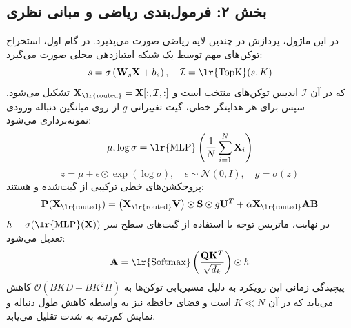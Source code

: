 \subsection*{بخش ۲: فرمول‌بندی ریاضی و مبانی نظری }
در این ماژول، پردازش در چندین لایه ریاضی صورت می‌پذیرد. در گام اول، استخراج توکن‌های مهم توسط یک شبکه امتیازدهی محلی صورت می‌گیرد:
\begin{equation}
s = \sigma\left(\mathbf{W}_s \mathbf{X} + b_s\right), \quad \mathcal{I} = \text{\lr{TopK}}(s, K)
\end{equation}
که در آن $\mathcal{I}$ اندیس توکن‌های منتخب است و $\mathbf{X}_{\text{\lr{routed}}} = \mathbf{X}[:, \mathcal{I}, :]$ تشکیل می‌شود. 
سپس برای هر هدایتگر خطی، گیت تغییراتی $g$ از روی میانگین دنباله ورودی نمونه‌برداری می‌شود:
\begin{equation}
\mu, \log \sigma = \text{\lr{MLP}}\left(\frac{1}{N} \sum_{i=1}^N \mathbf{X}_i\right)
\end{equation}
\begin{equation}
z = \mu + \epsilon \odot \exp(\log \sigma), \quad \epsilon \sim \mathcal{N}(0, I), \quad g = \sigma(z)
\end{equation}
پروجکشن‌های خطی ترکیبی از  گیت‌شده و  هستند:
\begin{equation}
\mathbf{P}(\mathbf{X}_{\text{\lr{routed}}}) = \left( \mathbf{X}_{\text{\lr{routed}}} \mathbf{V} \right) \odot \mathbf{S} \odot g \mathbf{U}^T + \alpha \mathbf{X}_{\text{\lr{routed}}} \mathbf{A} \mathbf{B}
\end{equation}
در نهایت، ماتریس توجه با استفاده از گیت‌های سطح سر  $h = \sigma(\text{\lr{MLP}}(\mathbf{X}))$ تعدیل می‌شود:
\begin{equation}
\mathbf{A} = \text{\lr{Softmax}}\left( \frac{\mathbf{Q}\mathbf{K}^T}{\sqrt{d_k}} \right) \odot h
\end{equation}
پیچیدگی زمانی این رویکرد به دلیل مسیریابی توکن‌ها به $\mathcal{O}(B K D + B K^2 H)$ کاهش می‌یابد که در آن $K \ll N$ است و فضای حافظه نیز به واسطه کاهش طول دنباله و نمایش کم‌رتبه به شدت تقلیل می‌یابد.

